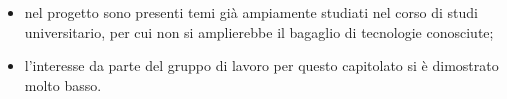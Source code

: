 \begin{itemize}
\item nel progetto sono presenti temi già ampiamente studiati nel corso di studi universitario, per cui non si amplierebbe il bagaglio di tecnologie conosciute;
\item l'interesse da parte del gruppo di lavoro per questo capitolato si è dimostrato molto basso.

\end{itemize}